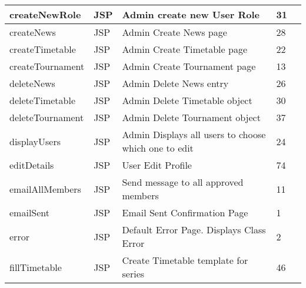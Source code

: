 \begin{table}[H]
\begin{center}
\begin{tabular}{| l | l | l| l |p{1cm} |}
	createNewRole & JSP & Admin create new User Role & 31\\ \hline	
	createNews & JSP & Admin Create News page & 28\\ \hline	
	createTimetable & JSP & Admin Create Timetable page & 22\\ \hline	
	createTournament & JSP & Admin Create Tournament page & 13\\ \hline	
	deleteNews & JSP & Admin Delete News entry & 26\\ \hline	
	deleteTimetable & JSP & Admin Delete Timetable object & 30\\ \hline	
	deleteTournament & JSP & Admin Delete Tournament object & 37\\ \hline	
	displayUsers & JSP & Admin Displays all users to choose which one to edit & 24\\ \hline	
	editDetails & JSP & User Edit Profile & 74\\ \hline	
	emailAllMembers & JSP & Send message to all approved members & 11\\ \hline	
	emailSent & JSP & Email Sent Confirmation Page & 1\\ \hline	
	error & JSP & Default Error Page. Displays Class Error & 2\\ \hline	
	fillTimetable & JSP & Create Timetable template for series & 46\\ \hline	
    \end{tabular}
\end{center}
\end{table}
\pagebreak

